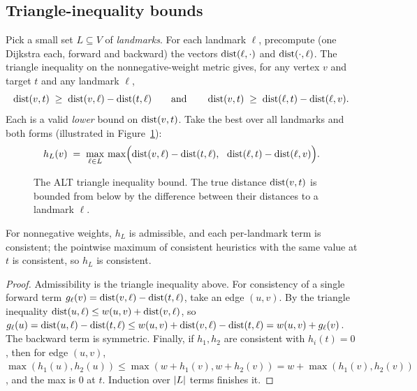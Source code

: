 \subsection{Triangle-inequality bounds}

Pick a small set $L\subseteq V$ of \emph{landmarks}. For each landmark
$\ell$, precompute (one Dijkstra each, forward and backward) the vectors
$\operatorname{dist}(\ell,\cdot)$ and $\operatorname{dist}(\cdot,\ell)$. The triangle inequality on the
nonnegative-weight metric gives, for any vertex $v$ and target $t$ and any
landmark $\ell$,
\[
  \operatorname{dist}(v,t) \;\ge\; \operatorname{dist}(v,\ell) - \operatorname{dist}(t,\ell)
  \qquad\text{and}\qquad
  \operatorname{dist}(v,t) \;\ge\; \operatorname{dist}(\ell,t) - \operatorname{dist}(\ell,v).
\]
Each is a valid \emph{lower} bound on $\operatorname{dist}(v,t)$. Take the best over all
landmarks and both forms (illustrated in Figure~\ref{fig:ch08:alt-triangle}):
\[
  h_L(v) \;=\; \max_{\ell\in L}\,
  \max\Bigl(\dist(v,\ell)-\dist(t,\ell),\ \ \dist(\ell,t)-\dist(\ell,v)\Bigr).
\]

\begin{figure}[htbp]
\centering
{}
\caption{The ALT triangle inequality bound. The true distance $\operatorname{dist}(v,t)$ is bounded from below by the difference between their distances to a landmark $\ell$.}
\label{fig:ch08:alt-triangle}
\end{figure}

\begin{lemma}
\label{ch08:lem-alt-consistent}
For nonnegative weights, $h_L$ is admissible, and each per-landmark term is
consistent; the pointwise maximum of consistent heuristics with the same value at
$t$ is consistent, so $h_L$ is consistent.
\end{lemma}
\begin{proof}
Admissibility is the triangle inequality above. For consistency of a single
forward term $g_\ell(v)=\operatorname{dist}(v,\ell)-\operatorname{dist}(t,\ell)$, take an edge $(u,v)$. By the
triangle inequality $\operatorname{dist}(u,\ell)\le w(u,v)+\operatorname{dist}(v,\ell)$, so
$g_\ell(u)=\operatorname{dist}(u,\ell)-\operatorname{dist}(t,\ell)\le w(u,v)+\operatorname{dist}(v,\ell)-\operatorname{dist}(t,\ell)
=w(u,v)+g_\ell(v)$. The backward term is symmetric. Finally, if $h_1,h_2$ are
consistent with $h_i(t)=0$, then for edge $(u,v)$,
$\max(h_1(u),h_2(u))\le \max(w+h_1(v),w+h_2(v))=w+\max(h_1(v),h_2(v))$, and the
max is $0$ at $t$. Induction over $\lvert L\rvert$ terms finishes it.
\end{proof}

